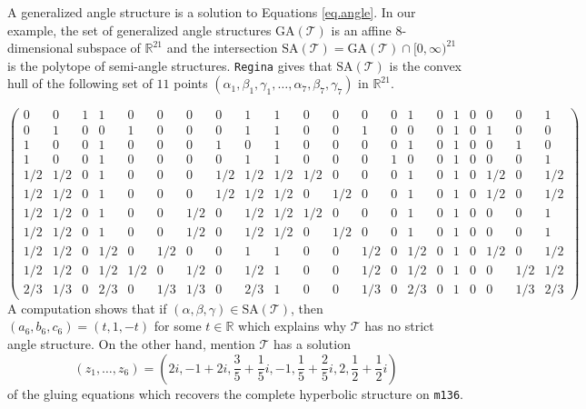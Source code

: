 \documentclass[12pt]{amsart}
\theoremstyle{definition}
\def\BR{\mathbb R}
\def\calT{\mathcal T}
\def\a{\alpha}
\def\ga{\gamma}
\def\b{\beta}
\def\be{  \begin{equation} }
\def\ee{  \end{equation} }
\def\GA{\mathrm{GA}}
\def\SA{\mathrm{SA}}
\newcommand{\mb}{\mathbf}
\numberwithin{equation}{section}
\begin{document}
A generalized angle structure is a solution to Equations \eqref{eq.angle}.
In our example, the set of generalized angle structures $\GA(\calT)$ 
is an affine $8$-dimensional subspace of $\BR^{21}$ and
the intersection $\SA(\calT)=\GA(\calT) \cap [0,\infty)^{21}$ is the polytope
of semi-angle structures. {\tt Regina} \cite{Bu}
gives that $\SA(\calT)$ is the convex hull of the following set of
$11$ points $(\a_1,\b_1,\ga_1,\dots,\a_7,\b_7,\ga_7)$ in $\BR^{21}$.

{\tiny
$$
\left(
\begin{array}{ccc|ccc|ccc|ccc|ccc|ccc|ccc}
0 & 0 & 1 & 1 & 0 & 0 & 0 & 0 & 1 & 1 & 0 & 0 & 0 & 0 & 1 & 0 & 1 & 0 & 0 &
0 & 1 \\
0 & 1 & 0 & 0 & 1 & 0 & 0 & 0 & 1 & 1 & 0 & 0 & 1 & 0 & 0 & 0 & 1 & 0 & 1 & 0 & 0 
\\ 
1 & 0 & 0 & 1 & 0 & 0 & 0 & 1 & 0 & 1 & 0 & 0 & 0 & 0 & 1 & 0 & 1 & 0 & 0 & 1 & 0 
\\ 
1 & 0 & 0 & 1 & 0 & 0 & 0 & 0 & 1 & 1 & 0 & 0 & 0 & 1 & 0 & 0 & 1 & 0 & 0 & 0 & 1 
\\ 
1/2 & 1/2 & 0 & 1 & 0 & 0 & 0 & 1/2 & 1/2 & 1/2 & 1/2 & 0 & 0 & 0 & 1 & 0 & 1 & 0 & 1/2 & 0 & 1/2
\\ 
1/2 & 1/2 & 0 & 1 & 0 & 0 & 0 & 1/2 & 1/2 & 1/2 & 0 & 1/2 & 0 & 0 & 1 & 0 & 1 & 0 & 1/2 & 0 & 1/2
\\ 
1/2 & 1/2 & 0 & 1 & 0 & 0 & 1/2 & 0 & 1/2 & 1/2 & 1/2 & 0 & 0 & 0 & 1 & 0 & 1 & 0 & 0 & 0 & 1 
\\ 
1/2 & 1/2 & 0 & 1 & 0 & 0 & 1/2 & 0 & 1/2 & 1/2 & 0 & 1/2 & 0 & 0 & 1 & 0 & 1 & 0 & 0 & 0 & 1 
\\ 
1/2 & 1/2 & 0 & 1/2 & 0 & 1/2 & 0 & 0 & 1 & 1 & 0 & 0 & 1/2 & 0 & 1/2 & 0 & 1 & 0 & 1/2 & 0 & 1/2
\\ 
1/2 & 1/2 & 0 & 1/2 & 1/2 & 0 & 1/2 & 0 & 1/2 & 1 & 0 & 0 & 1/2 & 0 & 1/2 & 0 & 1 & 0 & 0 & 1/2 & 1/2
\\ 2/3 & 1/3 & 0 & 2/3 & 0 & 1/3 & 1/3 & 0 & 2/3 & 1 & 0 & 0 & 1/3 & 0 & 2/3 & 0 & 1 & 0 & 0 & 1/3 & 2/3
\end{array}
\right)
$$
}
A computation shows that if $(\a,\b,\ga) \in \SA(\calT)$, then 
$(a_6,b_6,c_6)=(t,1,-t)$ for some $t \in \BR$ which explains why $\calT$ has 
no strict angle structure. 
On the other hand, \cite[Example 7.7]{HRS} mention $\calT$ has a solution
$$
(z_1,\dots,z_6)=\left(2 i,-1+2 i,\frac{3}{5}+\frac{1}{5}i,-1,
\frac{1}{5}+\frac{2}{5}i,2,\frac{1}{2}+\frac{1}{2}i \right)
$$
of the gluing equations which recovers the complete hyperbolic structure
on {\tt m136}.
\end{document}
